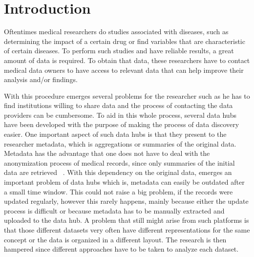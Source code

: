 \chapter{Introduction}
\label{chapter:introduction}

Oftentimes medical researchers do studies associated with diseases, such as determining the impact of a certain drug or find variables that are characteristic of certain diseases.
To perform such studies and have reliable results, a great amount of data is required.
To obtain that data, these researchers have to contact medical data owners to have access to relevant data that can help improve their analysis and/or findings.

With this procedure emerges several problems for the researcher such as he has to find institutions willing to share data and the process of contacting the data providers can be cumbersome.
To aid in this whole process, several data hubs have been developed with the purpose of making the process of data discovery easier.
One important aspect of such data hubs is that they present to the researcher metadata, which is aggregations or summaries of the original data.
Metadata has the advantage that one does not have to deal with the anonymization process of medical records, since only summaries of the initial data are retrieved ~\cite{egenvar, montra}.
With this dependency on the original data, emerges an important problem of data hubs which is, metadata can easily be outdated after a small time window.
This could not raise a big problem, if the records were updated regularly, however this rarely happens, mainly because either the update process is difficult or because metadata has to be manually extracted and uploaded to the data hub.
A problem that still might arise from such platforms is that those different datasets very often have different representations for the same concept or the data is organized in a different layout.
The research is then hampered since different approaches have to be taken to analyze each dataset.

